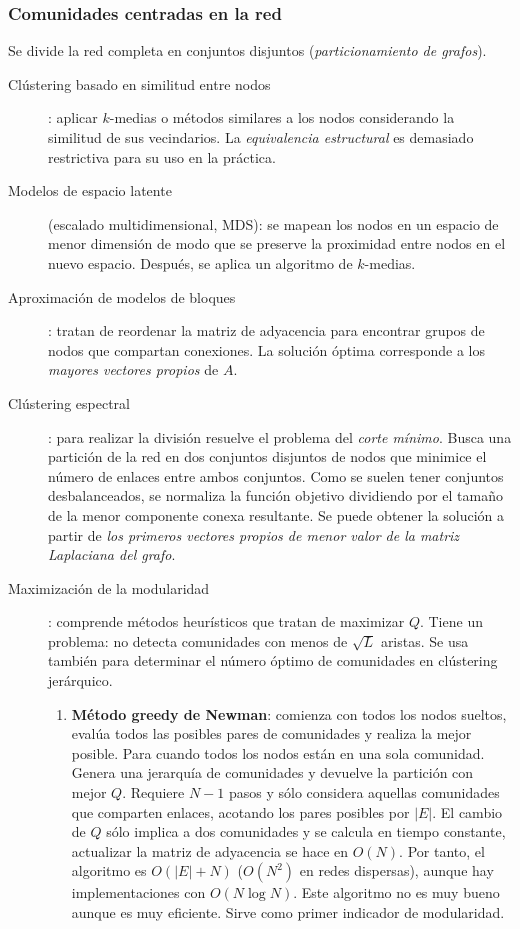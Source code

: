\documentclass[10pt,spanish, landscape, twocolumn]{article}
\begin{document}
\subsubsection{\textcolor{temaseis}Comunidades centradas en la red}
Se divide la red completa en conjuntos disjuntos (\textit{\textcolor{temaseis}{particionamiento de grafos}}).

\begin{description}
    \item[Clústering basado en similitud entre nodos]: aplicar $k$-medias o métodos similares a los nodos considerando la similitud de sus vecindarios. La \textit{\textcolor{temaseis}{equivalencia estructural}} es demasiado restrictiva para su uso en la práctica.
    \item[Modelos de espacio latente] (escalado multidimensional, MDS): se mapean los nodos en un espacio de menor dimensión de modo que se preserve la proximidad entre nodos en el nuevo espacio. Después, se aplica un algoritmo de $k$-medias.
    \item[Aproximación de modelos de bloques]: tratan de reordenar la matriz de adyacencia para encontrar grupos de nodos que compartan conexiones. La solución óptima corresponde a los \textit{\textcolor{temaseis}{mayores vectores propios}} de $A$.
    \item[Clústering espectral]: para realizar la división resuelve el problema del \textit{\textcolor{temaseis}{corte mínimo}}. Busca una partición de la red en dos conjuntos disjuntos de nodos que minimice el número de enlaces entre ambos conjuntos. Como se suelen tener conjuntos desbalanceados, se normaliza la función objetivo dividiendo por el tamaño de la menor componente conexa resultante. Se puede obtener la solución a partir de \textit{\textcolor{temaseis}{los primeros vectores propios de menor valor de la matriz Laplaciana del grafo}}.
    \item[Maximización de la modularidad]: comprende métodos heurísticos que tratan de maximizar $Q$. Tiene un problema: no detecta comunidades con menos de $\sqrt{L}$ aristas. Se usa también para determinar el número óptimo de comunidades en clústering jerárquico.
    \begin{enumerate}[\color{temaseis}{$\longrightarrow$}]
        \item \textbf{\textcolor{temaseis}{Método greedy de Newman}}: comienza con todos los nodos sueltos, evalúa todos las posibles pares de comunidades y realiza la mejor posible. Para cuando todos los nodos están en una sola comunidad. Genera una jerarquía de comunidades y devuelve la partición con mejor $Q$. Requiere $N-1$ pasos y sólo considera aquellas comunidades que comparten enlaces, acotando los pares posibles por $|E|$. El cambio de $Q$ sólo implica a dos comunidades y se calcula en tiempo constante, actualizar la matriz de adyacencia se hace en $O(N)$. Por tanto, el algoritmo es $O(|E|+N)$ ($O(N^2)$ en redes dispersas), aunque hay implementaciones con $O(N \log N)$. Este algoritmo no es muy bueno aunque es muy eficiente. Sirve como primer indicador de modularidad.

\end{enumerate}
\end{description}
\end{document}
